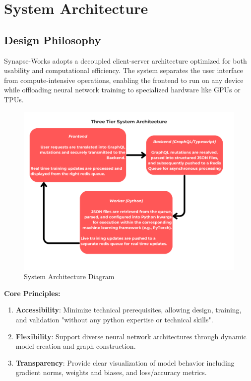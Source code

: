 \documentclass[10pt,conference]{IEEEtran}
\newcommand{\synapse}{Synapse-Works }
\begin{document}
\section{System Architecture}
\subsection{Design Philosophy}
\synapse adopts a decoupled client-server architecture optimized for both usability and computational efficiency. The system separates the user interface from compute-intensive operations, enabling the frontend to run on any device while offloading neural network training to specialized hardware like GPUs or TPUs.
\begin{figure}[htbp]
    \centering
    \includegraphics[width=1\linewidth]{Synapse-Works_SystemArchitectureDiagram.png}
    \caption{System Architecture Diagram}
    \label{fig:system_diagram}
\end{figure}
\textbf{Core Principles:}
\begin{enumerate}
    \item \textbf{Accessibility}: Minimize technical prerequisites, allowing design, training, and validation "without any python expertise or technical skills".
    \item \textbf{Flexibility}: Support diverse neural network architectures through dynamic model creation and graph construction.
    \item \textbf{Transparency}: Provide clear visualization of model behavior including gradient norms, weights and biases, and loss/accuracy metrics.
\end{enumerate}
\end{document}
